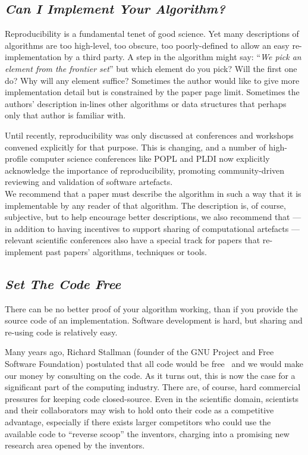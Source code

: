 \documentclass[a4paper,11pt]{article}
\begin{document}
\subsection{{\emph{Can I Implement Your Algorithm?}}}

Reproducibility is a fundamental tenet of
good science. Yet many descriptions of algorithms are too high-level,
too obscure, too poorly-defined to allow an easy re-implementation by
a third party. A step in the algorithm might say: ``{\emph{We pick an
element from the frontier set}}'' but which element do you pick? Will
the first one do?  Why will any element suffice? Sometimes the author
would like to give more implementation detail but is constrained by
the paper page limit. Sometimes the authors' description in-lines
other algorithms or data structures that perhaps only that author is
familiar with.

Until recently, reproducibility was only discussed at conferences and
workshops convened explicitly for that purpose. This is changing, and
a number of high-profile computer science conferences like POPL and
PLDI now explicitly acknowledge the importance of reproducibility,
promoting community-driven reviewing and validation of software
artefacts. \\

 We recommend that a
paper must describe the algorithm in such a way that it is
implementable by any reader of that algorithm. The description is, of
course, subjective, but to help encourage better descriptions, we also
recommend that --- in addition to having incentives to support sharing
of computational artefacts --- relevant scientific conferences also
have a special track for papers that re-implement past papers'
algorithms, techniques or tools.

\subsection{{\emph{Set The Code Free}}}

There can be no better proof of your algorithm working, than if you
provide the source code of an implementation. Software development is
hard, but sharing and re-using code is relatively easy.

Many years ago, Richard Stallman (founder of the GNU Project and Free
Software Foundation) postulated that all code would be
free~\cite{rms:2010} and we would make our money by consulting on the
code.  As it turns out, this is now the case for a significant
part of the computing industry. There are, of course, hard commercial
pressures for keeping code closed-source. Even in the scientific
domain, scientists and their collaborators may wish to hold onto their
code as a competitive advantage, especially if there exists larger
competitors who could use the available code to ``reverse scoop'' the
inventors, charging into a promising new research area opened by the
inventors.
\end{document}
